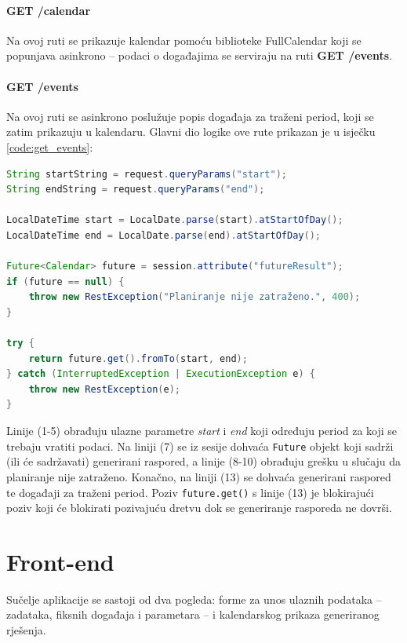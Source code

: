 \documentclass[times, utf8, zavrsni]{fer}
\begin{document}
\paragraph{GET /calendar} Na ovoj ruti se prikazuje kalendar pomoću biblioteke FullCalendar koji se popunjava asinkrono -- podaci o događajima se serviraju na ruti \textbf{GET /events}.

\paragraph{GET /events} Na ovoj ruti se asinkrono poslužuje popis događaja za traženi period, koji se zatim prikazuju u kalendaru. Glavni dio logike ove rute prikazan je u isječku \ref{code:get_events}:

\begin{lstlisting}[language=java, caption=Ruta \textbf{GET /events}, label={code:get_events}, mathescape]
String startString = request.queryParams("start");
String endString = request.queryParams("end");

LocalDateTime start = LocalDate.parse(start).atStartOfDay();
LocalDateTime end = LocalDate.parse(end).atStartOfDay();

Future<Calendar> future = session.attribute("futureResult");
if (future == null) {
    throw new RestException("Planiranje nije zatraženo.", 400);
}

try {
    return future.get().fromTo(start, end);
} catch (InterruptedException | ExecutionException e) {
    throw new RestException(e);
}
\end{lstlisting}

Linije (1-5) obrađuju ulazne parametre \textit{start} i \textit{end} koji određuju period za koji se trebaju vratiti podaci. Na liniji (7) se iz sesije dohvaća \texttt{Future} objekt koji sadrži (ili će sadržavati) generirani raspored, a linije (8-10) obrađuju grešku u slučaju da planiranje nije zatraženo. Konačno, na liniji (13) se dohvaća generirani raspored te događaji za traženi period. Poziv \texttt{future.get()} s linije (13) je blokirajući poziv koji će blokirati pozivajuću dretvu dok se generiranje rasporeda ne dovrši.

\section{Front-end}
Sučelje aplikacije se sastoji od dva pogleda: forme za unos ulaznih podataka -- zadataka, fiksnih događaja i parametara -- i kalendarskog prikaza generiranog rješenja.
\end{document}
